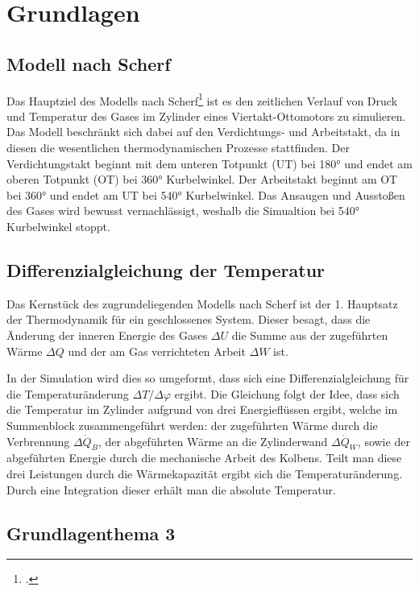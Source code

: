 \section{Grundlagen}

\subsection{Modell nach Scherf}
Das Hauptziel des Modells nach Scherf\footcite[Vgl.][94-101]{scherf2010} ist es den zeitlichen Verlauf von Druck und Temperatur des Gases im Zylinder eines Viertakt-Ottomotors zu simulieren.
Das Modell beschränkt sich dabei auf den Verdichtungs- und Arbeitstakt, da in diesen die wesentlichen thermodynamischen Prozesse stattfinden.
Der Verdichtungstakt beginnt mit dem unteren Totpunkt (UT) bei 180° und endet am oberen Totpunkt (OT) bei 360° Kurbelwinkel.
Der Arbeitstakt beginnt am OT bei 360° und endet am UT bei 540° Kurbelwinkel.
Das Ansaugen und Ausstoßen des Gases wird bewusst vernachlässigt, weshalb die Simualtion bei 540° Kurbelwinkel stoppt.

\subsection{Differenzialgleichung der Temperatur}
Das Kernstück des zugrundeliegenden Modells nach Scherf ist der 1. Hauptsatz der Thermodynamik für ein geschlossenes System. 
Dieser besagt, dass die Änderung der inneren Energie des Gases $\Delta U$ die Summe aus der zugeführten Wärme $\Delta Q$ und der am Gas verrichteten Arbeit $\Delta W$ ist.

In der Simulation wird dies so umgeformt, dass sich eine Differenzialgleichung für die Temperaturänderung $\Delta T / \Delta \varphi$  ergibt. 
Die Gleichung folgt der Idee, dass sich die Temperatur im Zylinder aufgrund von drei Energieflüssen ergibt, welche im Summenblock zusammengeführt werden: der zugeführten Wärme durch die Verbrennung $\Delta \dot{Q}_B$, der abgeführten Wärme an die Zylinderwand $\Delta \dot{Q}_W$, sowie der abgeführten Energie durch die mechanische Arbeit des Kolbens. 
Teilt man diese drei Leistungen durch die Wärmekapazität ergibt sich die Temperaturänderung. 
Durch eine Integration dieser erhält man die absolute Temperatur.

\subsection{Grundlagenthema 3}
